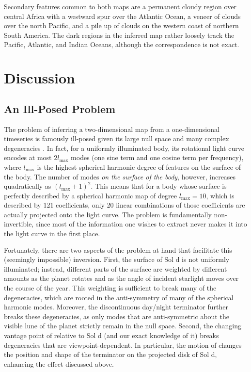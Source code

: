 \documentclass[modern]{aastex62}
\begin{document}
Secondary features common to both maps are a permanent cloudy region over
central Africa with a westward spur over the Atlantic Ocean, a veneer of clouds
over the north Pacific, and a pile up of clouds on the western coast of
northern South America. The dark regions in the inferred map rather loosely
track the Pacific, Atlantic, and Indian Oceans, although the correspondence
is not exact.

\section{Discussion}
\label{sec:discussion}

\subsection{An Ill-Posed Problem}
\label{sec:illposed}

The problem of inferring a two-dimensional map from a one-dimensional
timeseries is famously ill-posed given its large null space and many complex
degeneracies \citep[e.g.,][]{CowanFuentesHaggard2013}. In fact, for a 
uniformly illuminated body, its rotational light curve encodes at most
$2l_\mathrm{max}$ modes (one sine term and one cosine term per frequency), 
where $l_\mathrm{max}$ is the highest spherical
harmonic degree of features on the surface of the body. The number of modes
\emph{on the surface of the body}, however, increases quadratically 
as $(l_\mathrm{max} + 1)^2$. This means that for a body whose surface is
perfectly described by a spherical harmonic map of degree $l_\mathrm{max} = 10$,
which is described by 121 coefficients, only 20 linear combinations
of those coefficients are actually projected onto the light curve. The
problem is fundamentally non-invertible, since most of the information
one wishes to extract never makes it into the light curve in the first place.

Fortunately, there are two aspects of the problem at hand that facilitate
this (seemingly impossible) inversion. First, the surface of Sol d is
not uniformly illuminated; instead, different parts of the surface are weighted
by different amounts as the planet rotates and as the angle of incident starlight
moves over the course of the year. This weighting is sufficient to break many
of the degeneracies, which are rooted in the anti-symmetry of many of the spherical
harmonic modes. Moreover, the discontinuous day/night terminator further
breaks these degeneracies, as only modes that are anti-symmetric about
the visible lune of the planet strictly remain in the null space. Second, 
the changing vantage point of \TESS relative to Sol d (and our exact knowledge of it)
breaks degeneracies that are viewpoint-dependent. In particular, the motion of
\TESS changes the position and shape of the terminator on the projected disk
of Sol d, enhancing the effect discussed above.
\end{document}
